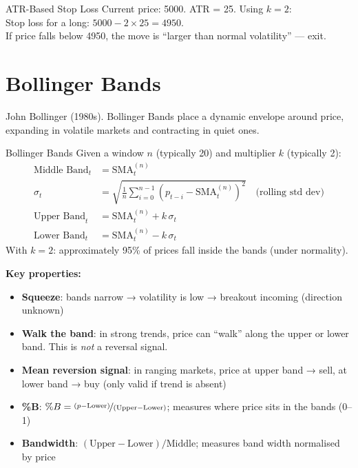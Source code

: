 \documentclass[12pt,a4paper,openany]{report}
\theoremstyle{definition}
\begin{document}
\begin{examplebox}{ATR-Based Stop Loss}
Current price: 5000. ATR = 25. Using $k = 2$: \\
Stop loss for a long: $5000 - 2 \times 25 = 4950$. \\
If price falls below 4950, the move is ``larger than normal volatility'' — exit.
\end{examplebox}

\section{Bollinger Bands}

John Bollinger (1980s). Bollinger Bands place a dynamic envelope around price, expanding in volatile markets and contracting in quiet ones.

\begin{definitionbox}{Bollinger Bands}
Given a window $n$ (typically 20) and multiplier $k$ (typically 2):
\begin{align}
  \text{Middle Band}_t &= \text{SMA}_t^{(n)} \\
  \sigma_t &= \sqrt{\frac{1}{n}\sum_{i=0}^{n-1}(p_{t-i} - \text{SMA}_t^{(n)})^2} \quad \text{(rolling std dev)} \\
  \text{Upper Band}_t &= \text{SMA}_t^{(n)} + k\,\sigma_t \\
  \text{Lower Band}_t &= \text{SMA}_t^{(n)} - k\,\sigma_t
\end{align}
With $k=2$: approximately 95\% of prices fall inside the bands (under normality).
\end{definitionbox}

\textbf{Key properties:}
\begin{itemize}
  \item \textbf{Squeeze}: bands narrow → volatility is low → breakout incoming (direction unknown)
  \item \textbf{Walk the band}: in strong trends, price can ``walk'' along the upper or lower band. This is \emph{not} a reversal signal.
  \item \textbf{Mean reversion signal}: in ranging markets, price at upper band → sell, at lower band → buy (only valid if trend is absent)
  \item \textbf{\%B}: $\%B = \nicefrac{(p - \text{Lower})}{(\text{Upper} - \text{Lower})}$; measures where price sits in the bands (0--1)
  \item \textbf{Bandwidth}: $({\text{Upper} - \text{Lower}})/{\text{Middle}}$; measures band width normalised by price
\end{itemize}
\end{document}

